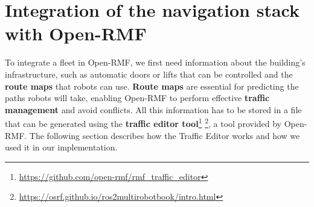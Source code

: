 \section{Integration of the navigation stack with Open-RMF} \label{Integration of the navigation stack with Open-RMF}
To integrate a fleet in Open-RMF, we first need information about the building's infrastructure, such as automatic doors or lifts that can be controlled and the \textbf{route maps} that robots can use. \textbf{Route maps} are essential for predicting the paths robots will take, enabling Open-RMF to perform effective \textbf{traffic management} and avoid conflicts. All this information has to be stored in a file that can be generated using the \textbf{traffic editor tool}\footnote{\href{https://github.com/open-rmf/rmf\_traffic\_editor}{https://github.com/open-rmf/rmf\_traffic\_editor}}  \footnote{\href{https://osrf.github.io/ros2multirobotbook/intro.html}{https://osrf.github.io/ros2multirobotbook/intro.html}}, a tool provided by Open-RMF. The following section describes how the Traffic Editor works and how we used it in our implementation.
